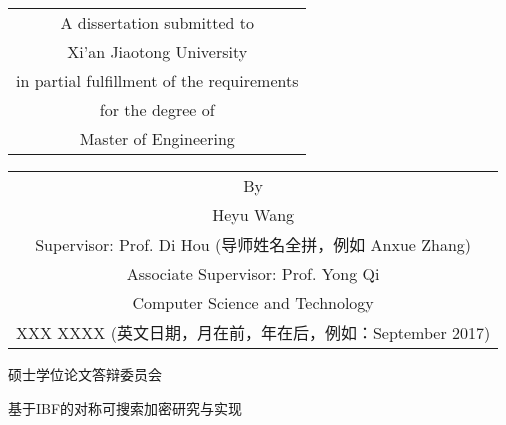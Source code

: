 \begin{titlepage}
\begin{center}
		\vspace{4.7cm}
		{\sanhao
			\begin{center} \renewcommand{\arraystretch}{1.4}
				\begin{tabular}{c}
					A dissertation submitted to  \\
					Xi'an Jiaotong University \\
					in partial fulfillment of the requirements \\
					for the degree of \\
					Master of Engineering \\
				\end{tabular} \renewcommand{\arraystretch}{1}
			\end{center} 
		}
		
		\vspace{3cm}
		{\sanhao
			\begin{center} \renewcommand{\arraystretch}{1.5}
				\begin{tabular}{c}
					By \\
					Heyu Wang \\
					Supervisor: Prof. Di Hou (导师姓名全拼，例如 Anxue Zhang) \\
					Associate Supervisor: Prof. Yong Qi\\
					Computer Science and Technology\\
					XXX XXXX (英文日期，月在前，年在后，例如：September 2017) \\
				\end{tabular} \renewcommand{\arraystretch}{1}
			\end{center} 
		}
	\end{center}
	\clearpage{\pagestyle{empty}\cleardoublepage}
	
	\newpage\thispagestyle{empty}
	\begin{center}
		\parbox[t][0.7cm][t]{\textwidth}{}
		
		\begin{center}{\hei 硕士学位论文答辩委员会}\end{center}
		
		\vspace{1cm}
		\begin{center}{\hei 基于IBF的对称可搜索加密研究与实现}\end{center}
		

\end{center}
\end{titlepage}

